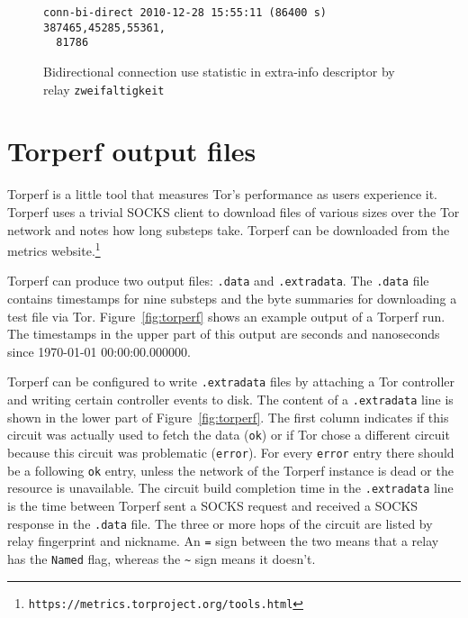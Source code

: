 \documentclass{article}
\begin{document}
\begin{figure}
\begin{verbatim}
conn-bi-direct 2010-12-28 15:55:11 (86400 s) 387465,45285,55361,
  81786
\end{verbatim}
\vspace{-1em}
\caption{Bidirectional connection use statistic in extra-info descriptor
by relay \texttt{zweifaltigkeit}}
\label{fig:connbidirect}
\end{figure}

\section{Torperf output files}
\label{sec:torperf}

Torperf is a little tool that measures Tor's performance as users
experience it.
Torperf uses a trivial SOCKS client to download files of various sizes
over the Tor network and notes how long substeps take.
Torperf can be downloaded from the metrics
website.\footnote{\texttt{https://metrics.torproject.org/tools.html}}

Torperf can produce two output files: \verb+.data+ and \verb+.extradata+.
The \verb+.data+ file contains timestamps for nine substeps and the byte
summaries for downloading a test file via Tor.
Figure~\ref{fig:torperf} shows an example output of a Torperf run.
The timestamps in the upper part of this output are seconds and
nanoseconds since 1970-01-01 00:00:00.000000.

Torperf can be configured to write \verb+.extradata+ files by attaching
a Tor controller and writing certain controller events to disk.
The content of a \verb+.extradata+ line is shown in the lower part of
Figure~\ref{fig:torperf}.
The first column indicates if this circuit was actually used to fetch
the data (\verb+ok+) or if Tor chose a different circuit because this
circuit was problematic (\verb+error+).
For every \verb+error+ entry there should be a following \verb+ok+ entry,
unless the network of the Torperf instance is dead or the resource is
unavailable.
The circuit build completion time in the \verb+.extradata+ line is the
time between Torperf sent a SOCKS request and received a SOCKS response in
the \verb+.data+ file.
The three or more hops of the circuit are listed by relay fingerprint and
nickname.
An \verb+=+ sign between the two means that a relay has the \texttt{Named}
flag, whereas the \verb+~+ sign means it doesn't.
\end{document}
